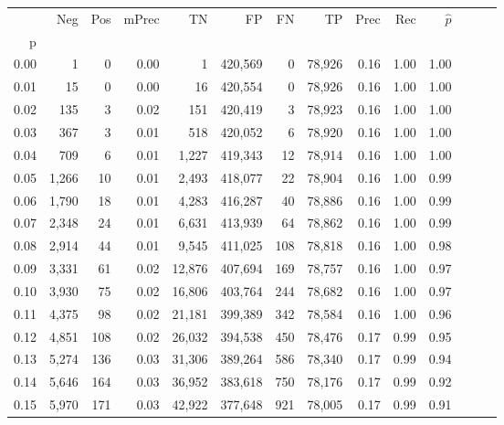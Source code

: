 \begin{tabular}{rrrrrrrrrrrrrr}
\toprule
{} &    Neg &    Pos & mPrec &       TN &       FP &      FN &      TP &  Prec &   Rec & $\hat{p}$ \\
p    &        &        &       &          &          &         &         &       &       &           \\
\midrule
0.00 &      1 &      0 &  0.00 &        1 &  420,569 &       0 &  78,926 &  0.16 &  1.00 &      1.00 \\
0.01 &     15 &      0 &  0.00 &       16 &  420,554 &       0 &  78,926 &  0.16 &  1.00 &      1.00 \\
0.02 &    135 &      3 &  0.02 &      151 &  420,419 &       3 &  78,923 &  0.16 &  1.00 &      1.00 \\
0.03 &    367 &      3 &  0.01 &      518 &  420,052 &       6 &  78,920 &  0.16 &  1.00 &      1.00 \\
0.04 &    709 &      6 &  0.01 &    1,227 &  419,343 &      12 &  78,914 &  0.16 &  1.00 &      1.00 \\
0.05 &  1,266 &     10 &  0.01 &    2,493 &  418,077 &      22 &  78,904 &  0.16 &  1.00 &      0.99 \\
0.06 &  1,790 &     18 &  0.01 &    4,283 &  416,287 &      40 &  78,886 &  0.16 &  1.00 &      0.99 \\
0.07 &  2,348 &     24 &  0.01 &    6,631 &  413,939 &      64 &  78,862 &  0.16 &  1.00 &      0.99 \\
0.08 &  2,914 &     44 &  0.01 &    9,545 &  411,025 &     108 &  78,818 &  0.16 &  1.00 &      0.98 \\
0.09 &  3,331 &     61 &  0.02 &   12,876 &  407,694 &     169 &  78,757 &  0.16 &  1.00 &      0.97 \\
0.10 &  3,930 &     75 &  0.02 &   16,806 &  403,764 &     244 &  78,682 &  0.16 &  1.00 &      0.97 \\
0.11 &  4,375 &     98 &  0.02 &   21,181 &  399,389 &     342 &  78,584 &  0.16 &  1.00 &      0.96 \\
0.12 &  4,851 &    108 &  0.02 &   26,032 &  394,538 &     450 &  78,476 &  0.17 &  0.99 &      0.95 \\
0.13 &  5,274 &    136 &  0.03 &   31,306 &  389,264 &     586 &  78,340 &  0.17 &  0.99 &      0.94 \\
0.14 &  5,646 &    164 &  0.03 &   36,952 &  383,618 &     750 &  78,176 &  0.17 &  0.99 &      0.92 \\
0.15 &  5,970 &    171 &  0.03 &   42,922 &  377,648 &     921 &  78,005 &  0.17 &  0.99 &      0.91 \\

\end{tabular}
